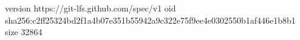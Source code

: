 version https://git-lfs.github.com/spec/v1
oid sha256:c2ff25324bd2f1a4b07e351b55942a9c322e75f9ee4e0302550b1af446e1b8b1
size 32864
